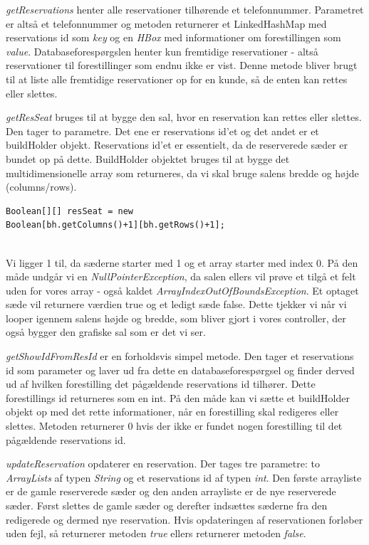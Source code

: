 \documentclass[final]{report}
\begin{document}
\emph{getReservations} henter alle reservationer tilhørende et telefonnummer. Parametret er altså et telefonnummer og metoden returnerer et LinkedHashMap med reservations id som \emph{key} og en \emph{HBox} med informationer om forestillingen som \emph{value}. Databaseforespørgslen henter kun fremtidige reservationer - altså reservationer til forestillinger som endnu ikke er vist. Denne metode bliver brugt til at liste alle fremtidige reservationer op for en kunde, så de enten kan rettes eller slettes. 

\emph{getResSeat} bruges til at bygge den sal, hvor en reservation kan rettes eller slettes. Den tager to parametre. Det ene er reservations id’et og det andet er et buildHolder objekt. Reservations id’et er essentielt, da de reserverede sæder er bundet op på dette. BuildHolder objektet bruges til at bygge det multidimensionelle array som returneres, da vi skal bruge salens bredde og højde (columns/rows). \\

\begin{verbatim}
Boolean[][] resSeat = new
Boolean[bh.getColumns()+1][bh.getRows()+1];
\end{verbatim}\\

Vi ligger 1 til, da sæderne starter med 1 og et array starter med index 0. På den måde undgår vi en \emph{NullPointerException}, da salen ellers vil prøve et tilgå et felt uden for vores array - også kaldet \emph{ArrayIndexOutOfBoundsException}. 
Et optaget sæde vil returnere værdien true og et ledigt sæde false. Dette tjekker vi når vi looper igennem salens højde og bredde, som bliver gjort i vores controller, der også bygger den grafiske sal som er det vi ser. 

\emph{getShowIdFromResId} er en forholdsvis simpel metode. Den tager et reservations id som parameter og laver ud fra dette en databaseforespørgsel og finder derved ud af hvilken forestilling det pågældende reservations id tilhører. Dette forestillings id returneres som en int. På den måde kan vi sætte et buildHolder objekt op med det rette informationer, når en forestilling skal redigeres eller slettes. Metoden returnerer 0 hvis der ikke er fundet nogen forestilling til det pågældende reservations id. 

\emph{updateReservation} opdaterer en reservation. Der tages tre parametre: to \emph{ArrayLists} af typen \emph{String} og et reservations id af typen \emph{int}. Den første arrayliste er de gamle reserverede sæder og den anden arrayliste er de nye reserverede sæder. Først slettes de gamle sæder og derefter indsættes sæderne fra den redigerede og dermed nye reservation. Hvis opdateringen af reservationen forløber uden fejl, så returnerer metoden \emph{true} ellers returnerer metoden \emph{false}. 
\end{document}
